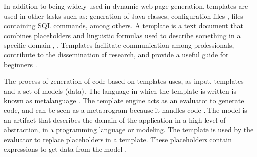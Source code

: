 
In addition to being widely used in dynamic web page generation, templates are used in other tasks such as: generation of Java \cite{arnoldus2007} classes, configuration files \cite{costa2015}, files containing SQL commands, among others. A template is a text document that combines placeholders and linguistic formulas used to describe something in a specific domain \cite{arnoldus2007}, \cite{segura2017}. Templates facilitate communication among professionals, contribute to the dissemination of research, and provide a useful guide for beginners \cite{segura2017}.


The process of generation of code based on templates uses, as input, templates and a set of models (data). The language in which the template is written is known as metalanguage \cite{arnoldus2011}. The template engine acts as an evaluator to generate code, and can be seen as a metaprogram because it handles code \cite{arnoldus2011}. The model is an artifact that describes the domain of the application in a high level of abstraction, in a programming language or modeling. The template is used by the evaluator to replace placeholders in a template. These placeholders contain expressions to get data from the model \cite{arnoldus2007}.

